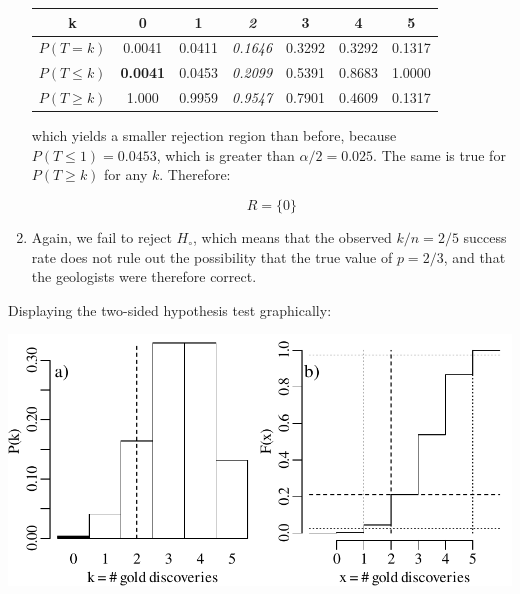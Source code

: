 \begin{enumerate}
  \begin{center}
    \begin{tabular}{ccccccc}
      k & \textbf{0} & 1 & \textit{2} & 3 & 4 & 5 \\ \hline
      $P(T=k)$ & 0.0041 & 0.0411 & \textit{0.1646} & 0.3292 & 0.3292 & 0.1317 \\
      $P({T}\leq{k})$ & \textbf{0.0041} & 0.0453 &
      \textit{0.2099} & 0.5391 & 0.8683 & 1.0000 \\
      $P({T}\geq{k})$ & 1.000 & 0.9959 & \textit{0.9547} & 0.7901 & 0.4609 & 0.1317
    \end{tabular}
  \end{center}

  \noindent which yields a smaller rejection region than before,
  because $P(T\leq{1})=0.0453$, which is greater than
  $\alpha/2=0.025$.  The same is true for $P(T\geq{k})$ for any
  $k$. Therefore:

  \[
  R = \{0\}
  \]

\item Again, we fail to reject $H_\circ$, which means that the
  observed $k/n=2/5$ success rate does not rule out the possibility
  that the true value of $p=2/3$, and that the geologists were
  therefore correct.
  
\end{enumerate}

Displaying the two-sided hypothesis test graphically:\\

\noindent\begin{minipage}[t][][b]{.6\textwidth}
  \includegraphics[width=\textwidth]{../figures/2sidedbinomialrejection5.pdf}\\
\end{minipage}
\begin{minipage}[t][][t]{.4\textwidth}
  \label{fig:2sidedbinomialrejection5}
\end{minipage}

